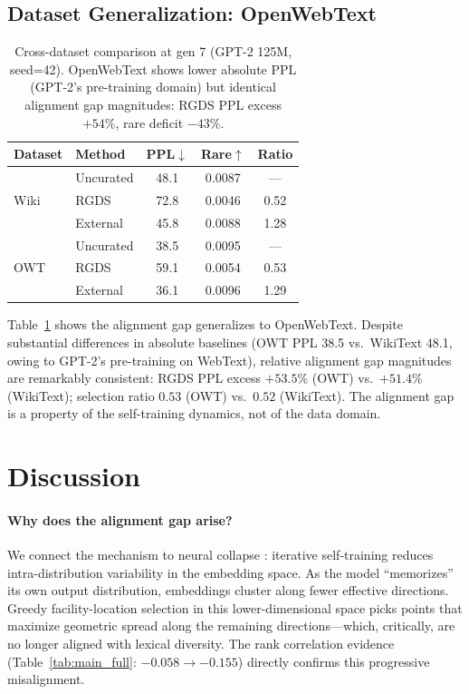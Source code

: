 \documentclass[11pt,a4paper]{article}
\begin{document}
\subsection{Dataset Generalization: OpenWebText}

\begin{table}[t]
\centering
\small
\begin{tabular}{llccc}
\toprule
\textbf{Dataset} & \textbf{Method} & \textbf{PPL}$\downarrow$ & \textbf{Rare}$\uparrow$ & \textbf{Ratio} \\
\midrule
\multirow{3}{*}{Wiki} & Uncurated & 48.1 & 0.0087 & --- \\
 & RGDS & 72.8 & 0.0046 & 0.52 \\
 & External & 45.8 & 0.0088 & 1.28 \\
\midrule
\multirow{3}{*}{OWT} & Uncurated & 38.5 & 0.0095 & --- \\
 & RGDS & 59.1 & 0.0054 & 0.53 \\
 & External & 36.1 & 0.0096 & 1.29 \\
\bottomrule
\end{tabular}
\caption{Cross-dataset comparison at gen 7 (GPT-2 125M, seed=42). OpenWebText shows lower absolute PPL (GPT-2's pre-training domain) but identical alignment gap magnitudes: RGDS PPL excess $+54\%$, rare deficit $-43\%$.}
\label{tab:dataset}
\end{table}

Table~\ref{tab:dataset} shows the alignment gap generalizes to OpenWebText.
Despite substantial differences in absolute baselines (OWT PPL 38.5 vs.\ WikiText 48.1, owing to GPT-2's pre-training on WebText), relative alignment gap magnitudes are remarkably consistent: RGDS PPL excess $+53.5\%$ (OWT) vs.\ $+51.4\%$ (WikiText); selection ratio $0.53$ (OWT) vs.\ $0.52$ (WikiText).
The alignment gap is a property of the self-training dynamics, not of the data domain.

\section{Discussion}
\label{sec:discussion}

\paragraph{Why does the alignment gap arise?}
We connect the mechanism to neural collapse \cite{papyan2020prevalence}: iterative self-training reduces intra-distribution variability in the embedding space.
As the model ``memorizes'' its own output distribution, embeddings cluster along fewer effective directions.
Greedy facility-location selection in this lower-dimensional space picks points that maximize geometric spread along the remaining directions---which, critically, are no longer aligned with lexical diversity.
The rank correlation evidence (Table~\ref{tab:main_full}: $-0.058 \to -0.155$) directly confirms this progressive misalignment.
\end{document}
